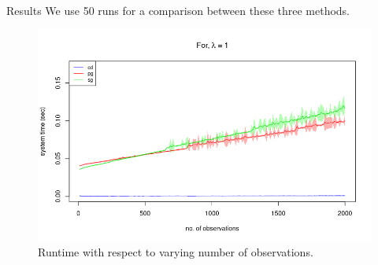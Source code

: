 \documentclass[tikz]{beamer}					%
\begin{document}
{
\begin{frame}{Results}
We use 50 runs for a comparison between these three methods.
\begin{figure}
    \centering
    \includegraphics[width=0.7\paperwidth]{figures/obs.png}
    \caption{Runtime with respect to varying number of observations.}
\end{figure}
\end{frame}
}
\end{document}
